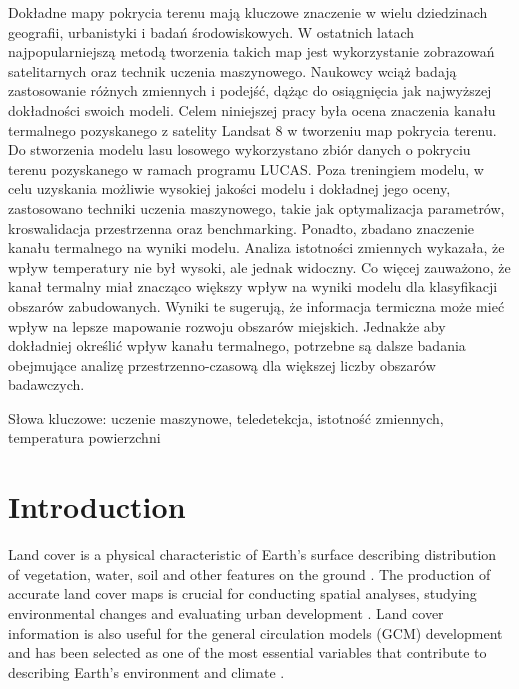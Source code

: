 \documentclass{amuthesis}
\begin{document}
Dokładne mapy pokrycia terenu mają kluczowe znaczenie w wielu
dziedzinach geografii, urbanistyki i badań środowiskowych. W ostatnich
latach najpopularniejszą metodą tworzenia takich map jest wykorzystanie
zobrazowań satelitarnych oraz technik uczenia maszynowego. Naukowcy
wciąż badają zastosowanie różnych zmiennych i podejść, dążąc do
osiągnięcia jak najwyższej dokładności swoich modeli. Celem niniejszej
pracy była ocena znaczenia kanału termalnego pozyskanego z satelity
Landsat 8 w tworzeniu map pokrycia terenu. Do stworzenia modelu lasu
losowego wykorzystano zbiór danych o pokryciu terenu pozyskanego w
ramach programu LUCAS. Poza treningiem modelu, w celu uzyskania możliwie
wysokiej jakości modelu i dokładnej jego oceny, zastosowano techniki
uczenia maszynowego, takie jak optymalizacja parametrów, kroswalidacja
przestrzenna oraz benchmarking. Ponadto, zbadano znaczenie kanału
termalnego na wyniki modelu. Analiza istotności zmiennych wykazała, że
wpływ temperatury nie był wysoki, ale jednak widoczny. Co więcej
zauważono, że kanał termalny miał znacząco większy wpływ na wyniki
modelu dla klasyfikacji obszarów zabudowanych. Wyniki te sugerują, że
informacja termiczna może mieć wpływ na lepsze mapowanie rozwoju
obszarów miejskich. Jednakże aby dokładniej określić wpływ kanału
termalnego, potrzebne są dalsze badania obejmujące analizę
przestrzenno-czasową dla większej liczby obszarów badawczych.

Słowa kluczowe: uczenie maszynowe, teledetekcja, istotność zmiennych,
temperatura powierzchni

\newpage

\sf\tighttoc\doublespacing


\hypertarget{sec-intro}{%
\chapter{Introduction}\label{sec-intro}}

Land cover is a physical characteristic of Earth's surface describing
distribution of vegetation, water, soil and other features on the ground
\autocite{rawat_monitoring_2015}. The production of accurate land cover
maps is crucial for conducting spatial analyses, studying environmental
changes \autocite{reis_analyzing_2008} and evaluating urban development
\autocite{hashem_change_2015}. Land cover information is also useful for
the general circulation models (GCM) development
\autocite{running_ecosystem_2008} and has been selected as one of the
most essential variables that contribute to describing Earth's
environment and climate \autocite{bojinski_concept_2014}.
\end{document}
